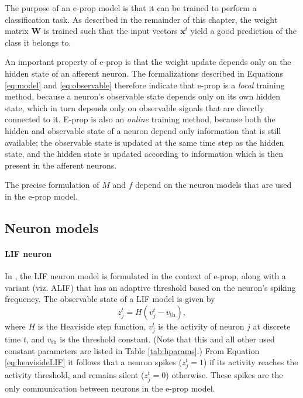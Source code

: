         The purpose of an e-prop model is that it can be trained to perform a classification task.
        As described in the remainder of this chapter, the weight matrix $\mathbf{W}$ is trained such that the input vectors $\mathbf{x}^t$ yield a good prediction of the class it belongs to.

        An important property of e-prop is that the weight update depends only on the hidden state of an afferent neuron.
        The formalizations described in Equations \ref{eq:model} and \ref{eq:observable} therefore indicate that e-prop is a \emph{local} training method, because a neuron's observable state depends only on its own hidden state, which in turn depends only on observable signals that are directly connected to it.
        E-prop is also an \emph{online} training method, because both the hidden and observable state of a neuron depend only information that is still available; the observable state is updated at the same time step as the hidden state, and the hidden state is updated according to information which is then present in the afferent neurons.

        The precise formulation of $M$ and $f$ depend on the neuron models that are used in the e-prop model.

    \subsection{Neuron models}\label{sec:alif}

        \paragraph{LIF neuron}
            In \citet{bellec2020solution}, the LIF neuron model is formulated in the context of e-prop, along with a variant (viz. ALIF) that has an adaptive threshold based on the neuron's spiking frequency.
            The observable state of a LIF model is given by
            \begin{equation}\label{eq:heavisideLIF}
            z^t_j = H\left(v_j^t-v_\text{th}\right),
            \end{equation}
            where $H$ is the Heaviside step function, $v^t_j$ is the activity of neuron $j$ at discrete time $t$, and $v_\text{th}$ is the threshold constant.
            (Note that this and all other used constant parameters are listed in Table \ref{tab:hparams}.)
            From Equation \ref{eq:heavisideLIF} it follows that a neuron spikes ($z^t_j = 1$) if its activity reaches the activity threshold, and remains silent ($z^t_j = 0$) otherwise.
            These spikes are the only communication between neurons in the e-prop model.

